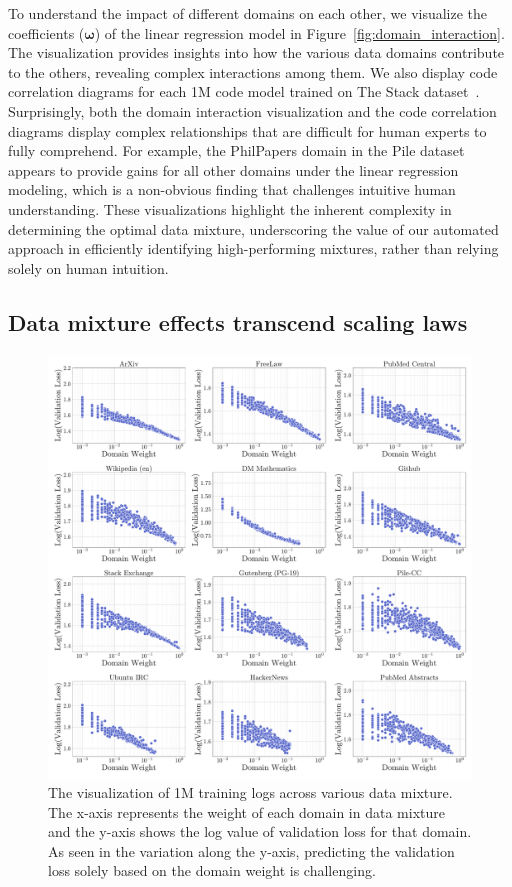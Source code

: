 To understand the impact of different domains on each other, we visualize the coefficients ($\boldsymbol{\omega}$) of the linear regression model in Figure~\ref{fig:domain_interaction}. The visualization provides insights into how the various data domains contribute to the others, revealing complex interactions among them. We also display code correlation diagrams for each 1M code model trained on The Stack dataset~\citep{thestack2022paper}. Surprisingly, both the domain interaction visualization and the code correlation diagrams display complex relationships that are difficult for human experts to fully comprehend. For example, the PhilPapers domain in the Pile dataset appears to provide gains for all other domains under the linear regression modeling, which is a non-obvious finding that challenges intuitive human understanding. These visualizations highlight the inherent complexity in determining the optimal data mixture, underscoring the value of our automated \ourmethod approach in efficiently identifying high-performing mixtures, rather than relying solely on human intuition.


\subsection{Data mixture effects transcend scaling laws}

\begin{figure}[t]
    \centering
    \includegraphics[width=1.0\textwidth]{figures/minimum_1024_log.pdf}
    \caption{The visualization of 1M training logs across various data mixture. The x-axis represents the weight of each domain in data mixture and the y-axis shows the log value of validation loss for that domain. As seen in the variation along the y-axis, predicting the validation loss solely based on the domain weight is challenging.}
    \label{fig:log_loss_vs_weight}
\end{figure}

